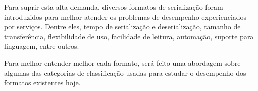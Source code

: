 Para suprir esta alta demanda, diversos formatos de serialização foram introduzidos para melhor atender os problemas de desempenho experienciados por serviços. Dentre eles, tempo de serialização e deserialização, tamanho de transferência, flexibilidade de uso, facilidade de leitura, automação, suporte para linguagem, entre outros. \cite{Guller2016}

\begin{table}[ht!]
  \centering
  \caption{Comparação de formatos de serialização}
\end{table}

Para melhor entender melhor cada formato, será feito uma abordagem sobre algumas das categorias de classificação usadas para estudar o desempenho dos formatos existentes hoje.





